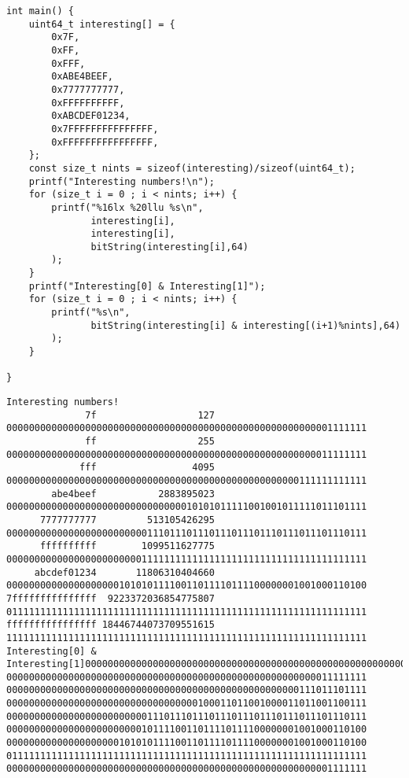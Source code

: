 \documentclass[11pt]{article}
\begin{document}
\begin{enumerate}
\begin{enumerate}
\begin{verbatim}
int main() {
    uint64_t interesting[] = {
        0x7F,
        0xFF,
        0xFFF,
        0xABE4BEEF,
        0x7777777777,
        0xFFFFFFFFFF,
        0xABCDEF01234,
        0x7FFFFFFFFFFFFFFF,
        0xFFFFFFFFFFFFFFFF,
    };
    const size_t nints = sizeof(interesting)/sizeof(uint64_t);
    printf("Interesting numbers!\n");
    for (size_t i = 0 ; i < nints; i++) {
        printf("%16lx %20llu %s\n",
               interesting[i],
               interesting[i],
               bitString(interesting[i],64)
        );
    }
    printf("Interesting[0] & Interesting[1]");
    for (size_t i = 0 ; i < nints; i++) {
        printf("%s\n",
               bitString(interesting[i] & interesting[(i+1)%nints],64)
        );
    }

}

\end{verbatim}

\begin{verbatim}
Interesting numbers!
              7f                  127 0000000000000000000000000000000000000000000000000000000001111111
              ff                  255 0000000000000000000000000000000000000000000000000000000011111111
             fff                 4095 0000000000000000000000000000000000000000000000000000111111111111
        abe4beef           2883895023 0000000000000000000000000000000010101011111001001011111011101111
      7777777777         513105426295 0000000000000000000000000111011101110111011101110111011101110111
      ffffffffff        1099511627775 0000000000000000000000001111111111111111111111111111111111111111
     abcdef01234       11806310404660 0000000000000000000010101011110011011110111100000001001000110100
7fffffffffffffff  9223372036854775807 0111111111111111111111111111111111111111111111111111111111111111
ffffffffffffffff 18446744073709551615 1111111111111111111111111111111111111111111111111111111111111111
Interesting[0] & Interesting[1]0000000000000000000000000000000000000000000000000000000001111111
0000000000000000000000000000000000000000000000000000000011111111
0000000000000000000000000000000000000000000000000000111011101111
0000000000000000000000000000000000100011011001000011011001100111
0000000000000000000000000111011101110111011101110111011101110111
0000000000000000000000001011110011011110111100000001001000110100
0000000000000000000010101011110011011110111100000001001000110100
0111111111111111111111111111111111111111111111111111111111111111
0000000000000000000000000000000000000000000000000000000001111111
\end{verbatim}
\end{enumerate}
\end{enumerate}
\end{document}
